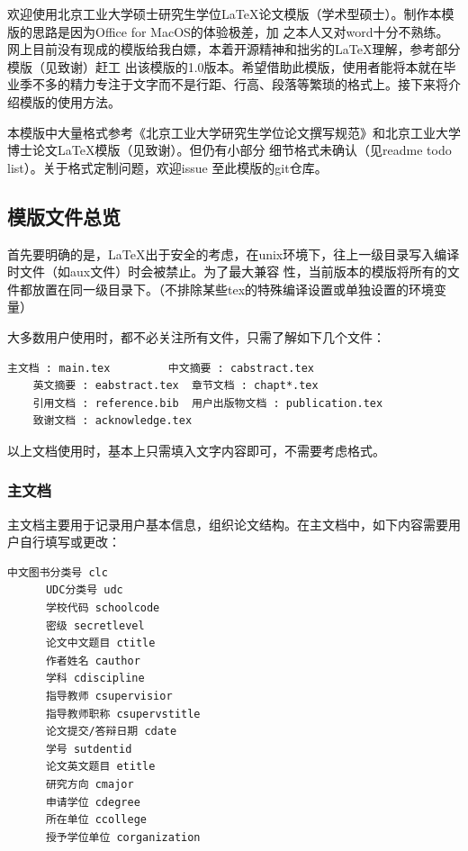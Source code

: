 \label{chap:intro}
欢迎使用北京工业大学硕士研究生学位\LaTeX 论文模版（学术型硕士）。制作本模版的思路是因为Office for MacOS的体验极差，加
之本人又对word十分不熟练。网上目前没有现成的模版给我白嫖，本着开源精神和拙劣的\LaTeX 理解，参考部分模版（见致谢）赶工
出该模版的1.0版本。希望借助此模版，使用者能将本就在毕业季不多的精力专注于文字而不是行距、行高、段落等繁琐的格式上。接下来将介绍模版的使用方法。

本模版中大量格式参考《北京工业大学研究生学位论文撰写规范》和北京工业大学博士论文\LaTeX 模版（见致谢）。但仍有小部分
细节格式未确认（见readme todo list）。关于格式定制问题，欢迎issue 至此模版的git仓库。

\label{sec:fst}

\subsection{模版文件总览}
首先要明确的是，\LaTeX 出于安全的考虑，在unix环境下，往上一级目录写入编译时文件（如aux文件）时会被禁止。为了最大兼容
性，当前版本的模版将所有的文件都放置在同一级目录下。（不排除某些tex的特殊编译设置或单独设置的环境变量）

大多数用户使用时，都不必关注所有文件，只需了解如下几个文件：

\begin{center}
  \begin{minipage}{0.95\textwidth}
    \begin{Verbatim}[frame=single]
    主文档 : main.tex         中文摘要 : cabstract.tex
    英文摘要 : eabstract.tex  章节文档 : chapt*.tex
    引用文档 : reference.bib  用户出版物文档 : publication.tex
    致谢文档 : acknowledge.tex
    \end{Verbatim}
  \end{minipage}
\end{center}

以上文档使用时，基本上只需填入文字内容即可，不需要考虑格式。

\subsubsection{主文档}

主文档主要用于记录用户基本信息，组织论文结构。在主文档中，如下内容需要用户自行填写或更改：

\begin{center}
  \begin{minipage}{0.65\textwidth}
    \begin{Verbatim}[frame=single]
      中文图书分类号 clc
      UDC分类号 udc
      学校代码 schoolcode
      密级 secretlevel
      论文中文题目 ctitle
      作者姓名 cauthor
      学科 cdiscipline
      指导教师 csupervisior
      指导教师职称 csupervstitle
      论文提交/答辩日期 cdate
      学号 sutdentid
      论文英文题目 etitle
      研究方向 cmajor
      申请学位 cdegree
      所在单位 ccollege
      授予学位单位 corganization
    \end{Verbatim}
  \end{minipage}
\end{center}

